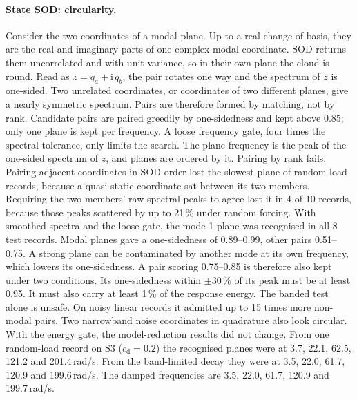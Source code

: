 \documentclass[preprint,12pt]{elsarticle}
\begin{document}
\paragraph{State SOD: circularity.} Consider the two coordinates of a modal plane. Up to a real change of basis, they are the real and imaginary parts of one complex modal coordinate. SOD returns them uncorrelated and with unit variance, so in their own plane the cloud is round. Read as $z=q_a+\mathrm i\,q_b$, the pair rotates one way and the spectrum of $z$ is one-sided. Two unrelated coordinates, or coordinates of two different planes, give a nearly symmetric spectrum.
Pairs are therefore formed by matching, not by rank. Candidate pairs are paired greedily by one-sidedness and kept above 0.85; only one plane is kept per frequency. A loose frequency gate, four times the spectral tolerance, only limits the search. The plane frequency is the peak of the one-sided spectrum of $z$, and planes are ordered by it.
Pairing by rank fails. Pairing adjacent coordinates in SOD order lost the slowest plane of random-load records, because a quasi-static coordinate sat between its two members. Requiring the two members' raw spectral peaks to agree lost it in 4 of 10 records, because those peaks scattered by up to 21\,\% under random forcing. With smoothed spectra and the loose gate, the mode-1 plane was recognised in all 8 test records. Modal planes gave a one-sidedness of 0.89--0.99, other pairs 0.51--0.75. A strong plane can be contaminated by another mode at its own frequency, which lowers its one-sidedness. A pair scoring 0.75--0.85 is therefore also kept under two conditions. Its one-sidedness within $\pm30\,\%$ of its peak must be at least 0.95. It must also carry at least 1\,\% of the response energy. The banded test alone is unsafe. On noisy linear records it admitted up to 15 times more non-modal pairs. Two narrowband noise coordinates in quadrature also look circular. With the energy gate, the model-reduction results did not change. From one random-load record on S3 ($c_{\mathrm d}=0.2$) the recognised planes were at 3.7, 22.1, 62.5, 121.2 and 201.4\,rad/s. From the band-limited decay they were at 3.5, 22.0, 61.7, 120.9 and 199.6\,rad/s. The damped frequencies are 3.5, 22.0, 61.7, 120.9 and 199.7\,rad/s.
\end{document}
